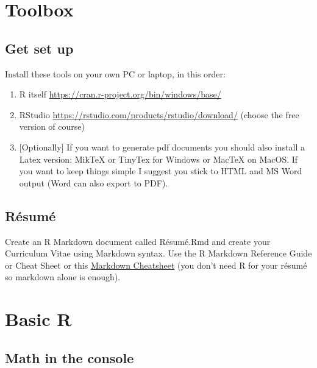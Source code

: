 \documentclass[]{book}
\providecommand{\tightlist}{%
  \setlength{\itemsep}{0pt}\setlength{\parskip}{0pt}}
\begin{document}
\hypertarget{toolbox-1}{%
\section{Toolbox}\label{toolbox-1}}

\hypertarget{get-set-up}{%
\subsection{Get set up}\label{get-set-up}}

Install these tools on your own PC or laptop, in this order:

\begin{enumerate}
\def\labelenumi{\arabic{enumi}.}
\tightlist
\item
  R itself \url{https://cran.r-project.org/bin/windows/base/}\\
\item
  RStudio \url{https://rstudio.com/products/rstudio/download/} (choose the free version of course)
\item
  {[}Optionally{]} If you want to generate pdf documents you should also install a Latex version: MikTeX or TinyTex for Windows or MacTeX on MacOS. If you want to keep things simple I suggest you stick to HTML and MS Word output (Word can also export to PDF).
\end{enumerate}

\hypertarget{resume}{%
\subsection{Résumé}\label{resume}}

Create an R Markdown document called Résumé.Rmd and create your Curriculum Vitae using Markdown syntax. Use the R Markdown Reference Guide or Cheat Sheet or this \href{https://guides.github.com/pdfs/markdown-cheatsheet-online.pdf}{Markdown Cheatsheet} (you don't need R for your résumé so markdown alone is enough).

\hypertarget{basic-r}{%
\section{Basic R}\label{basic-r}}

\hypertarget{math-in-the-console}{%
\subsection{Math in the console}\label{math-in-the-console}}
\end{document}
